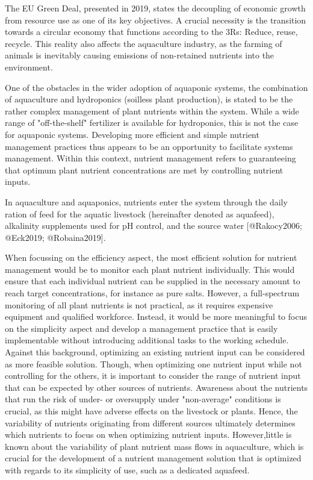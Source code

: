 






The EU Green Deal, presented in 2019, states the decoupling of economic growth from resource use as one of its key objectives. A crucial necessity is the transition towards a circular economy that functions according to the 3Rs: Reduce, reuse, recycle. This reality also affects the aquaculture industry, as the farming of animals is inevitably causing emissions of non-retained nutrients into the environment.


One of the obstacles in the wider adoption of aquaponic systems, the combination of aquaculture and hydroponics (soilless plant production), is stated to be the rather complex management of plant nutrients within the system. While a wide range of "off-the-shelf" fertilizer is available for hydroponics, this is not the case for aquaponic systems. Developing more efficient and simple nutrient management practices thus appears to be an opportunity to facilitate systems management. Within this context, nutrient management refers to guaranteeing that optimum plant nutrient concentrations are met by controlling nutrient inputs.



In aquaculture and aquaponics, nutrients enter the system through the daily ration of feed for the aquatic livestock (hereinafter denoted as aquafeed), alkalinity supplements used for pH control, and the source water [@Rakocy2006; @Eck2019; @Robaina2019].



When focussing on the efficiency aspect, the most efficient solution for nutrient management would be to monitor each plant nutrient individually. This would ensure that each individual nutrient can be supplied in the necessary amount to reach target concentrations, for instance as pure salts. However, a full-spectrum monitoring of all plant nutrients is not practical, as it requires expensive equipment and qualified workforce. Instead, it would be more meaningful to focus on the simplicity aspect and develop a management practice that is easily implementable without introducing additional tasks to the working schedule. Against this background, optimizing an existing nutrient input can be considered as more feasible solution. Though, when optimizing one nutrient input while not controlling for the others, it is important to consider the range of nutrient input that can be expected by other sources of nutrients. Awareness about the nutrients that run the risk of under- or oversupply under "non-average" conditions is crucial, as this might have adverse effects on the livestock or plants. Hence, the variability of nutrients originating from different sources ultimately determines which nutrients to focus on when optimizing nutrient inputs. However,little is known about the variability of plant nutrient mass flows in aquaculture, which is crucial for the development of a nutrient management solution that is optimized with regards to its simplicity of use, such as a dedicated aquafeed.
